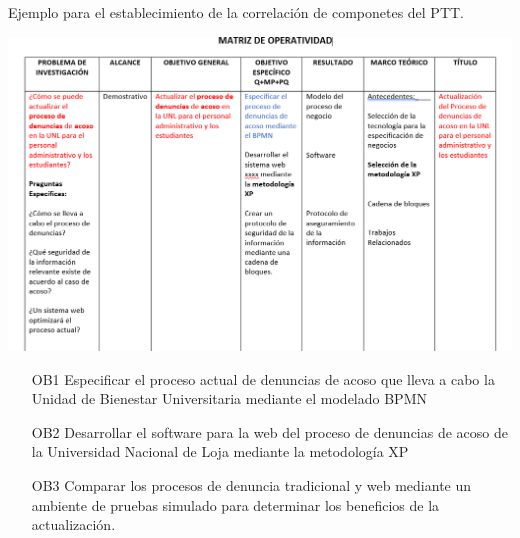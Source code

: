 Ejemplo para el establecimiento de la correlación de componetes del PTT.


\includegraphics[scale=0.6]{img/matriz.png}

\begin{enumerate}

    \item[OB1] \label{OB1} Especificar el proceso actual de denuncias de acoso que lleva a cabo la Unidad de Bienestar Universitaria mediante el modelado BPMN
    
    \item[OB2] Desarrollar el software para la web del proceso de denuncias de acoso de la Universidad Nacional de Loja mediante la metodología XP
    
    \item[OB3] Comparar los procesos de denuncia tradicional y web mediante un ambiente de pruebas simulado para determinar los beneficios de la actualización.
\end{enumerate}

